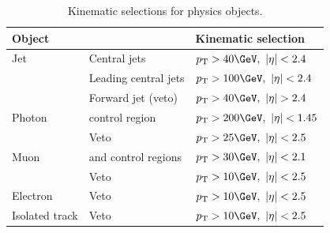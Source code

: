 \begin{table}[h!]
  \caption{Kinematic selections for physics objects.\label{tab:kine-sel}}
  \centering
  \footnotesize
  \begin{tabular}{ lll }
    \hline
    \hline
    Object 	& 	&Kinematic selection \\
    \hline
    \hline
    Jet  		&Central jets& $\pt > 40 \GeV,\ \etaabs < 2.4$		    \\
			&Leading central jets&	$\pt > 100 \GeV,\ \etaabs < 2.4$	\\	    	    
			&Forward jet (veto) &$\pt > 40 \GeV,\ \etaabs > 2.4$	\\	    
    Photon  		&\gj control region& $\pt > 200 \GeV,\ \etaabs < 1.45$	\\	    
			&Veto& $\pt > 25 \GeV,\ \etaabs < 2.5$		    \\
    Muon  		&\mj and \mmj control regions& $\pt > 30 \GeV,\ \etaabs < 2.1$	\\	    
			&Veto& $\pt > 10 \GeV,\ \etaabs < 2.5$		    \\
    Electron  		&Veto& $\pt > 10 \GeV,\ \etaabs < 2.5$		    \\
    Isolated track  	&Veto& $\pt > 10 \GeV,\ \etaabs < 2.5$		    \\
		
    
    \hline
    \hline
  \end{tabular}
  \end{table}
